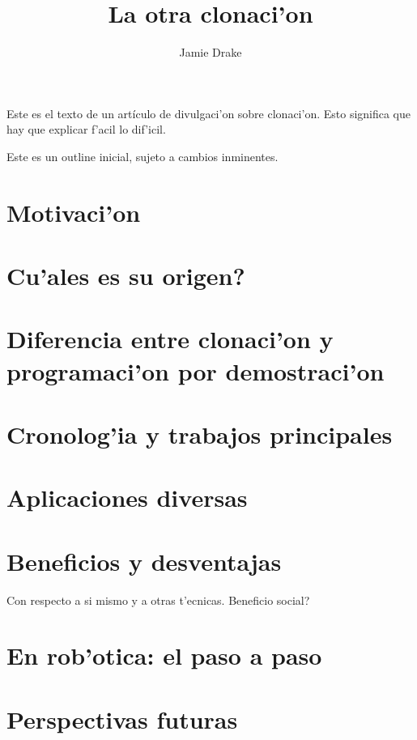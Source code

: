 \documentclass[11pt]{article}
\begin{document}
\title{La otra clonaci'on}
\author{Jamie Drake}
\maketitle
Este es el texto de un artículo de divulgaci'on sobre clonaci'on. Esto significa que hay que explicar f'acil lo dif'icil.

Este es un outline inicial, sujeto a cambios inminentes.

\section{Motivaci'on} 
\section {\textquestiondown Cu'ales es su origen?}
\section{Diferencia entre clonaci'on y programaci'on por demostraci'on}
\section{Cronolog'ia y trabajos principales}
\section{Aplicaciones diversas}
\section{Beneficios y desventajas}
Con respecto a si mismo y a otras t'ecnicas. Beneficio social?
\section{En rob'otica: el paso a paso}
\section{Perspectivas futuras}
\end{document}

